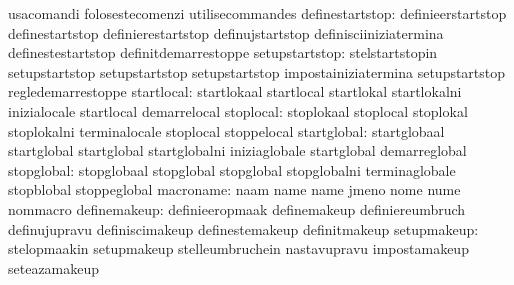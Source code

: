                                   usacomandi                       folosestecomenzi
                                  utilisecommandes
                 definestartstop: definieerstartstop               definestartstop
                                  definierestartstop               definujstartstop
                                  definisciiniziatermina           definestestartstop
                                  definitdemarrestoppe
                  setupstartstop: stelstartstopin                  setupstartstop
                                  setupstartstop                   setupstartstop
                                  impostainiziatermina             setupstartstop
                                  regledemarrestoppe
                      startlocal: startlokaal                      startlocal
                                  startlokal                       startlokalni
                                  inizialocale                     startlocal
                                  demarrelocal
                       stoplocal: stoplokaal                       stoplocal
                                  stoplokal                        stoplokalni
                                  terminalocale                    stoplocal
                                  stoppelocal
                     startglobal: startglobaal                     startglobal
                                  startglobal                      startglobalni
                                  iniziaglobale                    startglobal
                                  demarreglobal
                      stopglobal: stopglobaal                      stopglobal
                                  stopglobal                       stopglobalni
                                  terminaglobale                   stopblobal
                                  stoppeglobal
                       macroname: naam                             name
                                  name                             jmeno
                                  nome                             nume
                                  nommacro
                    definemakeup: definieeropmaak                  definemakeup
                                  definiereumbruch                 definujupravu
                                  definiscimakeup                  definestemakeup
                                  definitmakeup
                     setupmakeup: stelopmaakin                     setupmakeup
                                  stelleumbruchein                 nastavupravu
                                  impostamakeup                    seteazamakeup
